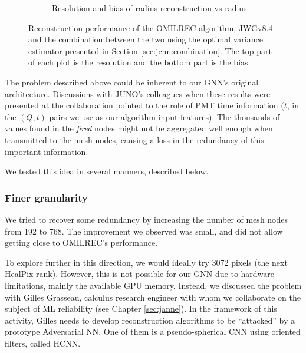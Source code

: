 \documentclass[../main.tex]{subfiles}
\begin{document}
\begin{figure}[ht]
\begin{subfigure}[t]{0.48\linewidth}
    \caption{Resolution and bias of radius reconstruction vs radius.}
    \label{fig:jgnn:MSBvRTC}
  \end{subfigure}
  \caption{Reconstruction performance of the OMILREC algorithm, JWGv8.4 and the combination between the two using the optimal variance estimator presented in Section \ref{sec:jcnn:combination}. The top part of each plot is the resolution and the bottom part is the bias.}
  \label{fig:jgnn:results_2}
\end{figure}

The problem described above could be inherent to our GNN's original architecture. Discussions with JUNO's colleagues when these results were presented at the collaboration pointed to the role of PMT time information ($t$, in the $(Q,t)$ pairs we use as our algorithm input features). The thousands of values found in the \textit{fired} nodes might not be aggregated well enough when transmitted to the mesh nodes, causing a loss in the redundancy of this important information.

We tested this idea in several manners, described below.

\subsubsection{Finer granularity}

We tried to recover some redundancy by increasing the number of mesh nodes from 192 to 768. The improvement we observed was small, and did not allow getting close to OMILREC's performance.

To explore further in this direction, we would ideally try 3072 pixels (the next HealPix rank). However, this is not possible for our GNN due to hardware limitations, mainly the available GPU memory. Instead, we discussed the problem with Gilles Grasseau, calculus research engineer with whom we collaborate on the subject of ML reliability (see Chapter \ref{sec:janne}). In the framework of this activity, Gilles needs to develop reconstruction algorithms to be ``attacked'' by a prototype Adversarial NN. One of them is a pseudo-spherical CNN using oriented filters, called HCNN.
\end{document}
